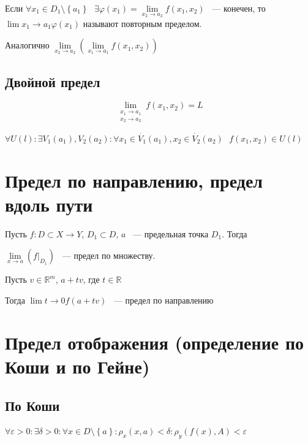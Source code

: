 \documentclass{article}
\begin{document}
            Если $\forall x_1 \in D_1 \setminus \left\{ a_1 \right\} \ \ \ \exists \varphi(x_1) = \lim\limits_{x_2 \rightarrow a_2} f(x_1, x_2)$ ~--- конечен, то $\lim\limits{x_1 \rightarrow a_1} \varphi(x_1)$ называют повторным пределом.
        
            Аналогично $\lim\limits_{x_2 \rightarrow a_2} \left(\lim\limits_{x_1 \rightarrow a_1} f(x_1, x_2) \right)$
            
        \subsection{Двойной предел}
        
            $$\lim_{\substack{x_1 \rightarrow a_1 \\ x_2 \rightarrow a_2 }} f(x_1, x_2) = L$$
            
            $\forall U(l) : \exists V_1(a_1), V_2(a_2) : \forall x_1 \in \dot{V_1}(a_1), x_2 \in \dot{V_2}(a_2) \ \ \ f(x_1, x_2) \in U(l)$
            
    \newpage
    
    \section{Предел по направлению, предел вдоль пути}
    
        Пусть $f : D \subset X \rightarrow Y$, $D_1 \subset D$, $a$ ~--- предельная точка $D_1$. Тогда
        
        $\lim\limits_{x \rightarrow a} \left( f \bigg|_{D_1} \right)$ ~--- предел по множеству.
        
        Пусть $v \in \mathbb{R}^m$, $a + tv$, где $t \in \mathbb{R}$
        
        Тогда $\lim\limits{t \rightarrow 0} f(a + tv)$ ~--- предел по направлению
        
    \newpage
    
    \section{Предел отображения (определение по Коши и по Гейне)}
    
        \subsection{По Коши}
        
            $\forall \varepsilon > 0 : \exists \delta > 0 : \forall x \in D \setminus \left\{a \right\} : \rho_x (x, a) < \delta : \rho_y (f(x), A) < \varepsilon$
            
\end{document}
